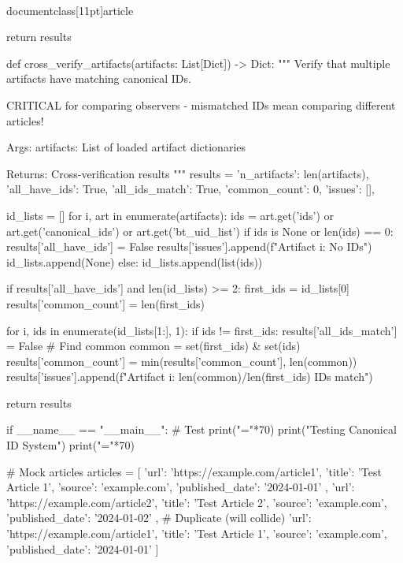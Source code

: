 \\documentclass[11pt]{article}
\begin{document}
\begin{CodeBlock}
    return results


def cross_verify_artifacts(artifacts: List[Dict]) -> Dict:
    """
    Verify that multiple artifacts have matching canonical IDs.
    
    CRITICAL for comparing observers - mismatched IDs mean
    comparing different articles!
    
    Args:
        artifacts: List of loaded artifact dictionaries
        
    Returns:
        Cross-verification results
    """
    results = {
        'n_artifacts': len(artifacts),
        'all_have_ids': True,
        'all_ids_match': True,
        'common_count': 0,
        'issues': [],
    }
    
    id_lists = []
    for i, art in enumerate(artifacts):
        ids = art.get('ids') or art.get('canonical_ids') or art.get('bt_uid_list')
        if ids is None or len(ids) == 0:
            results['all_have_ids'] = False
            results['issues'].append(f"Artifact {i}: No IDs")
            id_lists.append(None)
        else:
            id_lists.append(list(ids))
    
    if results['all_have_ids'] and len(id_lists) >= 2:
        first_ids = id_lists[0]
        results['common_count'] = len(first_ids)
        
        for i, ids in enumerate(id_lists[1:], 1):
            if ids != first_ids:
                results['all_ids_match'] = False
                # Find common
                common = set(first_ids) & set(ids)
                results['common_count'] = min(results['common_count'], len(common))
                results['issues'].append(f"Artifact {i}: {len(common)}/{len(first_ids)} IDs match")
    
    return results


if __name__ == "__main__":
    # Test
    print("="*70)
    print("Testing Canonical ID System")
    print("="*70)
    
    # Mock articles
    articles = [
        {
            'url': 'https://example.com/article1',
            'title': 'Test Article 1',
            'source': 'example.com',
            'published_date': '2024-01-01'
        },
        {
            'url': 'https://example.com/article2',
            'title': 'Test Article 2',
            'source': 'example.com',
            'published_date': '2024-01-02'
        },
        # Duplicate (will collide)
        {
            'url': 'https://example.com/article1',
            'title': 'Test Article 1',
            'source': 'example.com',
            'published_date': '2024-01-01'
        }
    ]
    

\end{CodeBlock}
\end{document}
